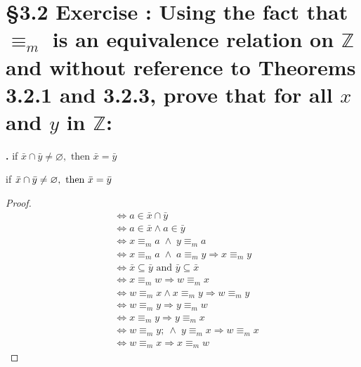 \documentclass[a4paper,11pt]{article}
\begin{document}
\section*{\S 3.2 Exercise : Using the fact that \(\equiv_{m}\) is an equivalence relation on \(\mathbb{Z}\) and without reference to Theorems 3.2.1 and 3.2.3, prove that for all \(x\) and \(y\) in \(\mathbb{Z}\):}
\setcounter{SubsectionCounter}{5}
\textbf{.}
if \(\bar{x} \cap \bar{y} \neq \varnothing, \text{ then } \bar{x} = \bar{y}\)
\begin{theorem1}
if \(\bar{x} \cap \bar{y} \neq \empty \varnothing, \text{ then } \bar{x} = 
\bar{y}\)
\begin{proof}
\begin{align*}
&\Leftrightarrow a \in \bar{x} \cap \bar{y}\\
&\Leftrightarrow a \in \bar{x} \wedge a \in \bar{y}\\
&\Leftrightarrow x \equiv_{m}a \; \wedge \;y\equiv_{m}a\\
&\Leftrightarrow x \equiv_{m}a \; \wedge \; a \equiv_{m}y \Rightarrow x\equiv_{m}y\\
&\Leftrightarrow \bar{x} \subseteq \bar{y} \text{ and } \bar{y} \subseteq \bar{x}\\
&\Leftrightarrow x \equiv_{m}w \Rightarrow w 
\equiv_{m}x\\
&\Leftrightarrow w \equiv_{m} x \wedge x \equiv_{m} y \Rightarrow w \equiv_{m} y\\
&\Leftrightarrow w \equiv_{m} y \Rightarrow y \equiv_{m}w \\
&\Leftrightarrow x \equiv_{m}y \Rightarrow y 
\equiv_{m}x \\
&\Leftrightarrow w \equiv_{m}y ;\ \wedge \; y \equiv_{m}x \Rightarrow w \equiv_{m}x\\
&\Leftrightarrow w \equiv_{m}x \Rightarrow x\equiv_{m}w
\end{align*}
\end{proof}
  \end{theorem1}
  \newpage
\setcounter{ProblemCounter}{10}
\end{document}
